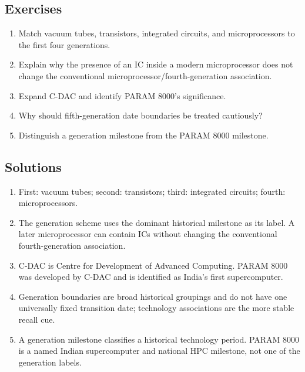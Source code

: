 \documentclass[11pt]{article}
\begin{document}
\subsection*{Exercises}
\begin{enumerate}[label=\arabic*.]
  \item Match vacuum tubes, transistors, integrated circuits, and
    microprocessors to the first four generations.
  \item Explain why the presence of an IC inside a modern microprocessor
    does not change the conventional microprocessor/fourth-generation
    association.
  \item Expand C-DAC and identify PARAM 8000's significance.
  \item Why should fifth-generation date boundaries be treated cautiously?
  \item Distinguish a generation milestone from the PARAM 8000 milestone.
\end{enumerate}

\subsection*{Solutions}
\begingroup\small
\begin{enumerate}[label=\arabic*.]
  \item First: vacuum tubes; second: transistors; third: integrated
    circuits; fourth: microprocessors.
  \item The generation scheme uses the dominant historical milestone as its
    label. A later microprocessor can contain ICs without changing the
    conventional fourth-generation association.
  \item C-DAC is Centre for Development of Advanced Computing. PARAM 8000
    was developed by C-DAC and is identified as India's first
    supercomputer.
  \item Generation boundaries are broad historical groupings and do not
    have one universally fixed transition date; technology associations
    are the more stable recall cue.
  \item A generation milestone classifies a historical technology period.
    PARAM 8000 is a named Indian supercomputer and national HPC milestone,
    not one of the generation labels.
\end{enumerate}
\endgroup
\end{document}
